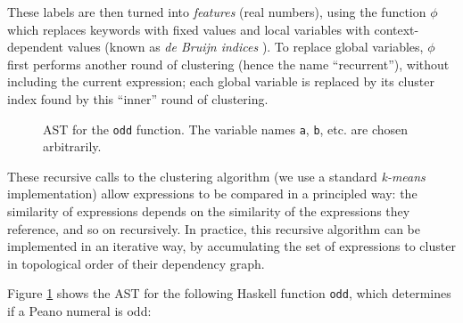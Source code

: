 \documentclass[]{sig-alternate}
\newcommand{\id}[1]{\texttt{"#1"}}
\newcommand{\CVar}{\texttt{Var}}
\newcommand{\CApp}{\texttt{App}}
\newcommand{\CLam}{\texttt{Lam}}
\newcommand{\CCase}{\texttt{Case}}
\newcommand{\CLocal}{\texttt{Local}}
\newcommand{\CGlobal}{\texttt{Global}}
\newcommand{\CConstructor}{\texttt{Constructor}}
\newcommand{\CAlt}{\texttt{Alt}}
\newcommand{\CDataAlt}{\texttt{DataAlt}}
\begin{document}
These labels are then turned into \emph{features} (real numbers), using the function $\phi$ which replaces keywords with fixed values and local variables with context-dependent values (known as \emph{de Bruijn indices} \cite{de1972lambda}). To replace global variables, $\phi$ first performs another round of clustering (hence the name
``recurrent''), without including the current expression; each global
variable is replaced by its cluster index found by this ``inner'' round
of clustering.

\begin{figure}
    \begin{small}
    \end{small}
    \caption{AST for the \texttt{odd} function. The variable names \texttt{a}, \texttt{b}, etc. are chosen arbitrarily.}
    \label{fig:astexample}
\end{figure}

These recursive calls to the clustering algorithm (we use a standard
\emph{k-means} implementation) allow expressions to be compared in a
principled way: the similarity of expressions depends on the similarity of the expressions they reference, and so on recursively. In practice, this recursive
algorithm can be implemented in an iterative way, by accumulating the set of expressions to cluster in topological order of their dependency graph.

Figure \ref{fig:astexample} shows the AST for the following Haskell function \texttt{odd}, which determines if a Peano numeral is odd:
\end{document}
